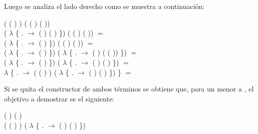 \begin{AgdaAlign}
Luego se analiza el lado derecho como se muestra a continuación:

\begin{flushright}
( ( ) ) \AgdaFunction{+} ( ( ) ( )) \\
( $\lambda$ \{ . $\rightarrow$  ( ) ( ) \}) \AgdaFunction{+} ( ( ) ( )) $=$ \\
( $\lambda$ \{ . $\rightarrow$  ( )  \}) \AgdaFunction{+} ( ( ) ( )) $=$ \\
( $\lambda$ \{ . $\rightarrow$  ( )  \}) \AgdaFunction{+} ( $\lambda$ \{ . $\rightarrow$  ( ) ( ( )) \}) $=$ \\
( $\lambda$ \{ . $\rightarrow$  ( )  \}) \AgdaFunction{+} ( $\lambda$ \{ . $\rightarrow$  ( ) ( ) \}) $=$ \\
 $\lambda$ \{ . $\rightarrow$ ( ( ) ) \AgdaFunction{+} ( $\lambda$ \{ . $\rightarrow$  ( ) ( ) \}) \} $=$ 
\end{flushright}

Si se quita el constructor  de ambos términos se obtiene que, para un  menor a , el objetivo a demostrar es el siguiente:
\begin{center}
\AgdaFunction{[}  \AgdaFunction{]}  (  \AgdaFunction{+}  ) ( ) \AgdaFunction{$\leq$} \\ ( ( ) ) \AgdaFunction{+} ( $\lambda$ \{ . $\rightarrow$  ( ) ( ) \})
\end{center}


\end{AgdaAlign}
